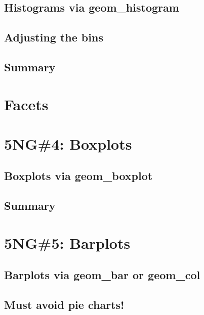 \documentclass[12pt, krantz2,]{krantz}
\begin{document}
\hypertarget{geomhistogram}{%
\subsection{Histograms via geom\_histogram}\label{geomhistogram}}

\hypertarget{adjustbins}{%
\subsection{Adjusting the bins}\label{adjustbins}}

\hypertarget{summary-2}{%
\subsection{Summary}\label{summary-2}}

\hypertarget{facets}{%
\section{Facets}\label{facets}}

\hypertarget{boxplots}{%
\section{5NG\#4: Boxplots}\label{boxplots}}

\hypertarget{geomboxplot}{%
\subsection{Boxplots via geom\_boxplot}\label{geomboxplot}}

\hypertarget{summary-3}{%
\subsection{Summary}\label{summary-3}}

\hypertarget{geombar}{%
\section{5NG\#5: Barplots}\label{geombar}}

\hypertarget{barplots-via-geom_bar-or-geom_col}{%
\subsection{Barplots via geom\_bar or geom\_col}\label{barplots-via-geom_bar-or-geom_col}}

\hypertarget{must-avoid-pie-charts}{%
\subsection{Must avoid pie charts!}\label{must-avoid-pie-charts}}
\end{document}
